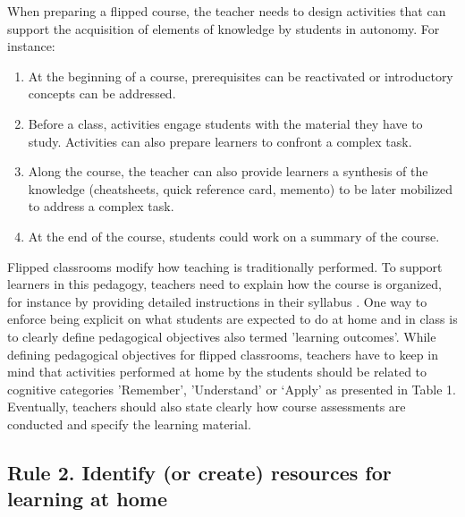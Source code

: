 \documentclass[10pt,letterpaper]{article}
\begin{document}
When preparing a flipped course, the teacher needs to design activities that can support 
the acquisition of elements of knowledge by students in autonomy. For instance:

\begin{enumerate}

\item At the beginning of a course, prerequisites can be reactivated or introductory concepts can be addressed.

\item Before a class, activities engage students with the material they have to study. 
Activities can also prepare learners to confront a complex task.

\item Along the course, the teacher can also provide learners a synthesis of the knowledge 
(cheatsheets, quick reference card, memento) to be later mobilized to address a complex task.

\item At the end of the course, students could work on a summary of the course.

\end{enumerate}

Flipped classrooms modify how teaching is traditionally performed. To support learners in this pedagogy, 
teachers need to explain how the course is organized, for instance by providing detailed instructions in
their syllabus \cite{grunert_obrien_course_2008}. One way to enforce being explicit on what students 
are expected to do at home and in class is to clearly define pedagogical objectives also termed 'learning outcomes'. 
While defining pedagogical objectives for flipped classrooms, teachers have to keep in mind 
that activities performed at home by the students should be related to cognitive categories 'Remember', 'Understand' 
or `Apply' as presented in Table 1. Eventually, teachers should also state clearly how course assessments 
are conducted and specify the learning material.


\subsection{Rule 2. Identify (or create) resources for learning at home}
\end{document}
